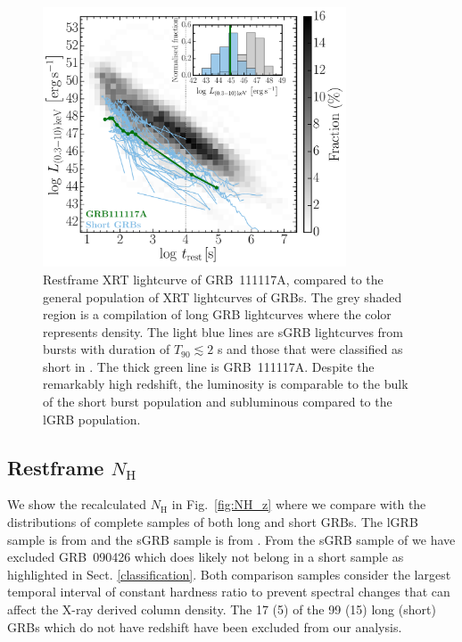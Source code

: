 \documentclass{aa}    %
\begin{document}
\begin{figure}
	\centering
	\includegraphics[width=9cm]{figures/XLC_111117A_rest.pdf}
	\caption{Restframe XRT lightcurve of GRB~111117A, compared to the general population of XRT lightcurves of GRBs. The grey shaded region is a compilation of long GRB lightcurves \citep{Evans2007, Evans2009} where the color represents density. The light blue lines are sGRB lightcurves from bursts with duration of $T_{90} \lesssim 2$ s and those that were classified as short in \citet{Kann2011, Berger2014, DAvanzo2014a}. The thick green line is GRB~111117A. Despite the remarkably high redshift, the luminosity is comparable to the bulk of the short burst population and subluminous compared to the lGRB population.}
	\label{fig:sxray_lightcurve}
\end{figure}

\subsection{Restframe $N_\mathrm{H}$} \label{restnH}

We show the recalculated $N_\mathrm{H}$ in Fig.~\ref{fig:NH_z} where we compare
with the distributions of complete samples of both long and short GRBs. The lGRB
sample is from \citet{Arcodia2016} and the sGRB sample is from
\citet{DAvanzo2014a}. From the sGRB sample of \citet{DAvanzo2014a} we have
excluded GRB~090426 which does likely not belong in a short sample as highlighted in
Sect. \ref{classification}. Both comparison samples consider the largest
temporal interval of constant hardness ratio to prevent spectral changes that
can affect the X-ray derived column density. The 17 (5) of the 99 (15) long
(short) GRBs which do not have redshift have been excluded from our analysis.
\end{document}
